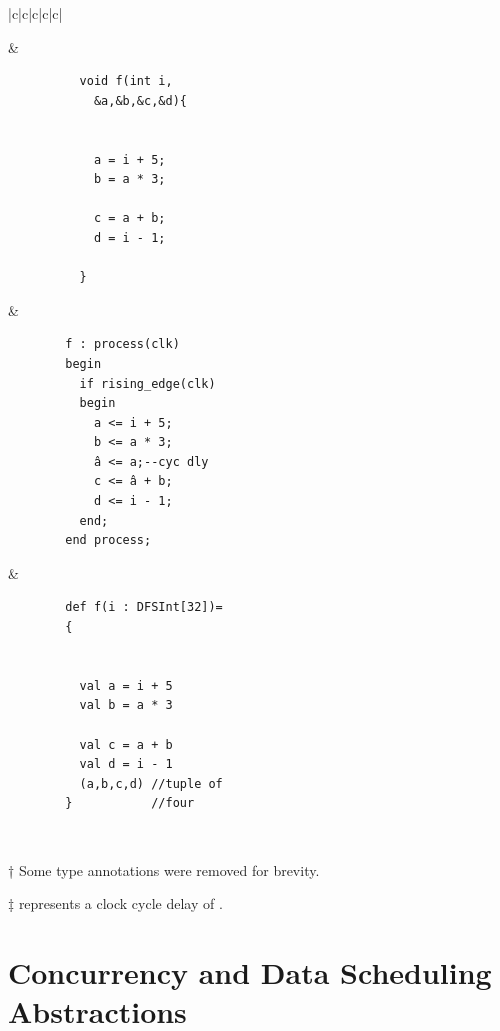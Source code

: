 \begin{table}[t]
\begin{threeparttable}
\begin{tabular}{|c|c|c|c|c|}
\begin{minipage}[b][3.1cm][c]{0.19\textwidth}
			\end{minipage}%
			&
			\begin{minipage}[b]{0.14\linewidth}
        \begin{verbatim}
          void f(int i,
            &a,&b,&c,&d){ 
            
            
            a = i + 5;
            b = a * 3;
            
            c = a + b;
            d = i - 1;
            
          }
				\end{verbatim}
			\end{minipage}
			&
			\begin{minipage}[b]{0.19\textwidth}
        \begin{verbatim}
        f : process(clk)
        begin 
          if rising_edge(clk)
          begin
            a <= i + 5;
            b <= a * 3;
            â <= a;--cyc dly
            c <= â + b;
            d <= i - 1;
          end; 
        end process;
				\end{verbatim}
			\end{minipage}
			&
			\begin{minipage}[b]{0.20\textwidth}
        \begin{verbatim}
        def f(i : DFSInt[32])= 
        {
        
          
          val a = i + 5
          val b = a * 3
          
          val c = a + b
          val d = i - 1
          (a,b,c,d) //tuple of
        }           //four
        \end{verbatim}
			\end{minipage}
			\\
			\hline
		\end{tabular}
		\begin{tablenotes}
			\item [†] Some type annotations were removed for brevity.
			\item [‡]  represents a clock cycle delay of .
		\end{tablenotes}
	\end{threeparttable}
\end{table}%

\section{Concurrency and Data Scheduling Abstractions}
\label{sec:concurrency_abstractions}

